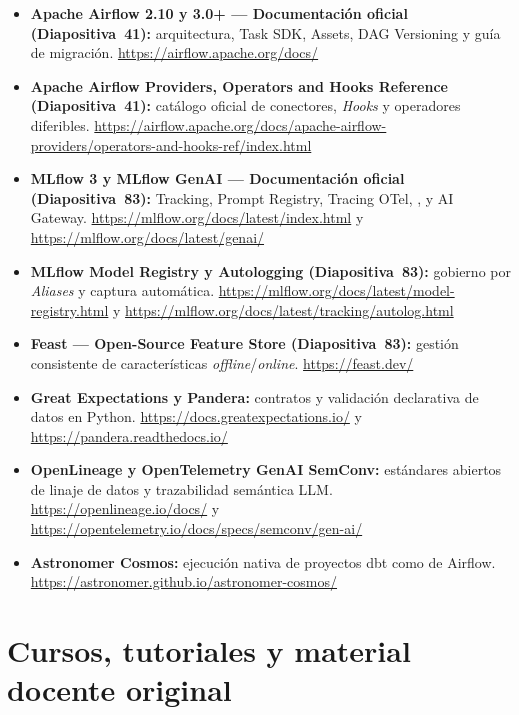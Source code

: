 {\small
\begin{itemize}[itemsep=2.5pt, topsep=3pt]
  \item \textbf{Apache Airflow 2.10 y 3.0+ --- Documentación oficial (Diapositiva~41):} arquitectura, Task SDK, Assets, DAG Versioning y guía de migración. \url{https://airflow.apache.org/docs/}

  \item \textbf{Apache Airflow Providers, Operators and Hooks Reference (Diapositiva~41):} catálogo oficial de conectores, \textit{Hooks} y operadores diferibles. \url{https://airflow.apache.org/docs/apache-airflow-providers/operators-and-hooks-ref/index.html}

  \item \textbf{MLflow 3 y MLflow GenAI --- Documentación oficial (Diapositiva~83):} Tracking, Prompt Registry, Tracing OTel, ,  y AI Gateway. \url{https://mlflow.org/docs/latest/index.html} y \url{https://mlflow.org/docs/latest/genai/}

  \item \textbf{MLflow Model Registry y Autologging (Diapositiva~83):} gobierno por \textit{Aliases} y captura automática. \url{https://mlflow.org/docs/latest/model-registry.html} y \url{https://mlflow.org/docs/latest/tracking/autolog.html}

  \item \textbf{Feast --- Open-Source Feature Store (Diapositiva~83):} gestión consistente de características \textit{offline}/\textit{online}. \url{https://feast.dev/}

  \item \textbf{Great Expectations y Pandera:} contratos y validación declarativa de datos en Python. \url{https://docs.greatexpectations.io/} y \url{https://pandera.readthedocs.io/}

  \item \textbf{OpenLineage y OpenTelemetry GenAI SemConv:} estándares abiertos de linaje de datos y trazabilidad semántica LLM. \url{https://openlineage.io/docs/} y \url{https://opentelemetry.io/docs/specs/semconv/gen-ai/}

  \item \textbf{Astronomer Cosmos:} ejecución nativa de proyectos dbt como  de Airflow. \url{https://astronomer.github.io/astronomer-cosmos/}
\end{itemize}
}

\section{Cursos, tutoriales y material docente original}\label{sec:bib-cursos}

